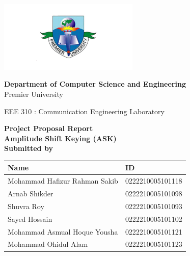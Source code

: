 \documentclass[12pt,a4paper]{article}
\begin{document}
\begin{titlepage}
    \centering
    \begin{center}
        \includegraphics[width=0.5\textwidth]{logo.png}
    \end{center}
\begin{center}
    \textbf{Department of Computer Science and Engineering}\\
    Premier University
\end{center}
\begin{center}
    \textnormal{EEE 310 : Communication Engineering Laboratory}
\end{center}
    \huge
    \textbf{Project Proposal Report}\\
    \vspace{0.5in}
    \LARGE
    \textbf{Amplitude Shift Keying (ASK)}\\
    \vspace{1in}
    \large
    \textbf {Submitted by}\\
    \begin{center}
        \renewcommand{\arraystretch}{1.5} %
        \begin{tabular}{|>{\raggedright\arraybackslash}p{}|p{}|} %
        \hline
        \textbf{Name} & \textbf{ID} \\
        \hline
        Mohammad Hafizur Rahman Sakib & 0222210005101118 \\
        \hline
        Arnab Shikder & 0222210005101098 \\
        \hline
        Shuvra Roy & 0222210005101093 \\
        \hline
        Sayed Hossain & 0222210005101102 \\
        \hline
        Mohammad Asmual Hoque Yousha & 0222210005101121 \\
        \hline
        Mohammad Ohidul Alam & 0222210005101123 \\
        \hline
        \end{tabular}
        \end{center}
    \vspace{0.5in}
 

\end{titlepage}
\end{document}

